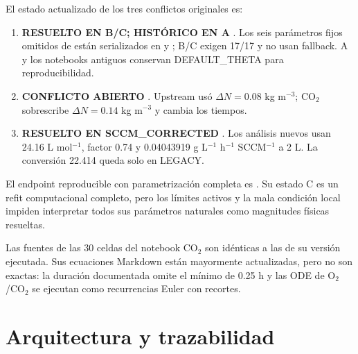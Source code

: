 \documentclass[11pt]{article}
\newcommand{\E}[1]{%
  \nobreak\hspace{0.16em}%
  \begingroup
  \setlength{\fboxsep}{1.5pt}%
  \colorbox{auditpale}{\textcolor{auditblue}{\sffamily\bfseries\scriptsize #1}}%
  \endgroup\hspace{0.16em}%
}
\newcommand{\code}[1]{{\small\ttfamily #1}}
\begin{document}
El estado actualizado de los tres conflictos originales es:
\begin{enumerate}[label=\textbf{C\arabic*.}]
\item \E{RESUELTO EN B/C; HISTÓRICO EN A}. Los seis parámetros fijos omitidos
de  están serializados en  y
; B/C exigen 17/17 y no usan fallback. A y los
notebooks antiguos conservan \code{DEFAULT\_THETA} para reproducibilidad.
\item \E{CONFLICTO ABIERTO}. Upstream usó $\Delta N=0.08$ kg m$^{-3}$; CO$_2$
sobrescribe $\Delta N=0.14$ kg m$^{-3}$ y cambia los tiempos.
\item \E{RESUELTO EN SCCM\_CORRECTED}. Los análisis nuevos usan 24.16
L mol$^{-1}$, factor 0.74 y 0.04043919 g L$^{-1}$ h$^{-1}$ SCCM$^{-1}$
a 2 L. La conversión 22.414 queda solo en LEGACY.
\end{enumerate}

El endpoint reproducible con parametrización completa es
. Su estado C es un
refit computacional completo, pero los límites activos y la mala condición
local impiden interpretar todos sus parámetros naturales como magnitudes
físicas resueltas.

Las fuentes de las 30 celdas del notebook CO$_2$ son idénticas a las de su
versión ejecutada. Sus ecuaciones Markdown están mayormente actualizadas, pero
no son exactas: la duración documentada omite el mínimo de 0.25 h y las ODE de
O$_2$/CO$_2$ se ejecutan como recurrencias Euler con recortes.

\section{Arquitectura y trazabilidad}
\end{document}
